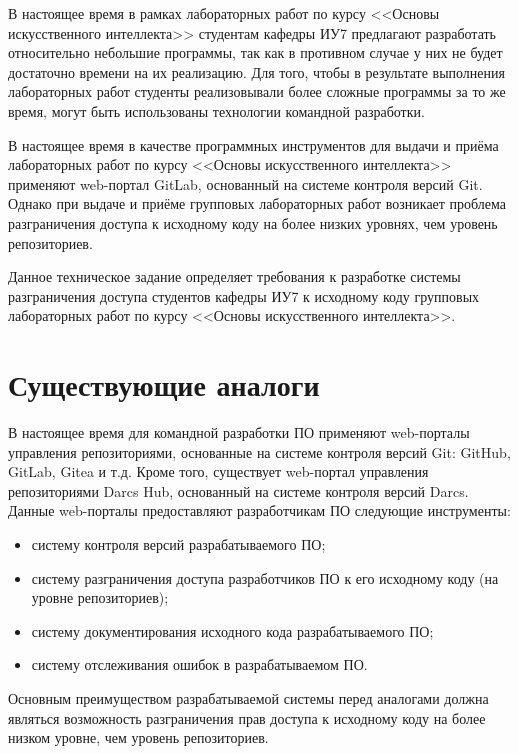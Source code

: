 \documentclass{bmstu}
\begin{document}
  В настоящее время в рамках лабораторных работ по курсу <<Основы
  искусственного интеллекта>> студентам кафедры ИУ7 предлагают
  разработать относительно небольшие программы, так как в противном
  случае у них не будет достаточно времени на их реализацию.
  Для того, чтобы в результате выполнения лабораторных работ студенты
  реализовывали более сложные программы за то же время, могут быть
  использованы технологии командной разработки.

  В настоящее время в качестве программных инструментов для выдачи и
  приёма лабораторных работ по курсу <<Основы искусственного
  интеллекта>> применяют web-портал GitLab, основанный на системе
  контроля версий Git.
  Однако при выдаче и приёме групповых лабораторных работ возникает
  проблема разграничения доступа к исходному коду на более низких
  уровнях, чем уровень репозиториев.

  Данное техническое задание определяет требования к разработке
  системы разграничения доступа студентов кафедры ИУ7 к исходному коду
  групповых лабораторных работ по курсу <<Основы искусственного
  интеллекта>>.

  \section{Существующие аналоги}

  В настоящее время для командной разработки ПО применяют web-порталы
  управления репозиториями, основанные на системе контроля версий Git:
  GitHub, GitLab, Gitea и т.д.
  Кроме того, существует web-портал управления репозиториями Darcs
  Hub, основанный на системе контроля версий Darcs.
  Данные web-порталы предоставляют разработчикам ПО следующие
  инструменты:
  \begin{itemize}[label=---]
    \item систему контроля версий разрабатываемого ПО;
    \item систему разграничения доступа разработчиков ПО к его
      исходному коду (на уровне репозиториев);
    \item систему документирования исходного кода разрабатываемого ПО;
    \item систему отслеживания ошибок в разрабатываемом ПО.
  \end{itemize}

  Основным преимуществом разрабатываемой системы перед аналогами
  должна являться возможность разграничения прав доступа к исходному
  коду на более низком уровне, чем уровень репозиториев.
\end{document}
